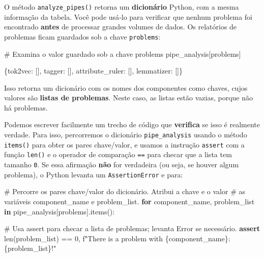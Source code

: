 \documentclass[
  brazilian,
  11pt,
]{article}
\newenvironment{Shaded}{\begin{snugshade}}{\end{snugshade}}
\newcommand{\BuiltInTok}[1]{\textcolor[rgb]{0.50,0.55,0.55}{#1}}
\newcommand{\CommentTok}[1]{\textcolor[rgb]{0.48,0.49,0.49}{#1}}
\newcommand{\ControlFlowTok}[1]{\textcolor[rgb]{0.99,0.74,0.29}{\textbf{#1}}}
\newcommand{\DecValTok}[1]{\textcolor[rgb]{0.96,0.45,0.00}{#1}}
\newcommand{\KeywordTok}[1]{\textcolor[rgb]{0.81,0.81,0.76}{\textbf{#1}}}
\newcommand{\NormalTok}[1]{\textcolor[rgb]{0.81,0.81,0.76}{#1}}
\newcommand{\OperatorTok}[1]{\textcolor[rgb]{0.81,0.81,0.76}{#1}}
\newcommand{\SpecialCharTok}[1]{\textcolor[rgb]{0.24,0.68,0.91}{#1}}
\newcommand{\SpecialStringTok}[1]{\textcolor[rgb]{0.85,0.27,0.33}{#1}}
\newcommand{\StringTok}[1]{\textcolor[rgb]{0.96,0.31,0.31}{#1}}
\let\oldtexttt\texttt
\renewcommand{\texttt}[1]{{\color{inlink}\oldtexttt{#1}}}
\begin{document}
O método \texttt{analyze\_pipes()} retorna um \textbf{dicionário}
Python, com a mesma informação da tabela. Você pode usá‑lo para
verificar que nenhum problema foi encontrado \textbf{antes} de processar
grandes volumes de dados. Os relatórios de problemas ficam guardados sob
a chave \texttt{problems}:

\begin{Shaded}
\begin{Highlighting}[]
\CommentTok{\# Examina o valor guardado sob a chave \textquotesingle{}problems\textquotesingle{}}
\NormalTok{pipe\_analysis[}\StringTok{\textquotesingle{}problems\textquotesingle{}}\NormalTok{]}
\end{Highlighting}
\end{Shaded}

\begin{Shaded}
\begin{Highlighting}[]
\NormalTok{\{\textquotesingle{}tok2vec\textquotesingle{}: [], \textquotesingle{}tagger\textquotesingle{}: [], \textquotesingle{}attribute\_ruler\textquotesingle{}: [], \textquotesingle{}lemmatizer\textquotesingle{}: []\}}
\end{Highlighting}
\end{Shaded}

Isso retorna um dicionário com os nomes dos componentes como chaves,
cujos valores são \textbf{listas de problemas}. Neste caso, as listas
estão vazias, porque não há problemas.

Podemos escrever facilmente um trecho de código que \textbf{verifica} se
isso é realmente verdade. Para isso, percorremos o dicionário
\texttt{pipe\_analysis} usando o método \texttt{items()} para obter os
pares chave/valor, e usamos a instrução \texttt{assert} com a função
\texttt{len()} e o operador de comparação \texttt{==} para checar que a
lista tem tamanho \texttt{0}. Se essa afirmação \textbf{não} for
verdadeira (ou seja, se houver algum problema), o Python levanta um
\texttt{AssertionError} e para:

\begin{Shaded}
\begin{Highlighting}[]
\CommentTok{\# Percorre os pares chave/valor do dicionário. Atribui a chave e o valor}
\CommentTok{\# as variáveis \textquotesingle{}component\_name\textquotesingle{} e \textquotesingle{}problem\_list\textquotesingle{}.}
\ControlFlowTok{for}\NormalTok{ component\_name, problem\_list }\KeywordTok{in}\NormalTok{ pipe\_analysis[}\StringTok{\textquotesingle{}problems\textquotesingle{}}\NormalTok{].items():}

    \CommentTok{\# Usa \textquotesingle{}assert\textquotesingle{} para checar a lista de problemas; levanta Error se necessário.}
    \ControlFlowTok{assert} \BuiltInTok{len}\NormalTok{(problem\_list) }\OperatorTok{==} \DecValTok{0}\NormalTok{, }\SpecialStringTok{f"There is a problem with }\SpecialCharTok{\{}\NormalTok{component\_name}\SpecialCharTok{\}}\SpecialStringTok{: }\SpecialCharTok{\{}\NormalTok{problem\_list}\SpecialCharTok{\}}\SpecialStringTok{!"}
\end{Highlighting}
\end{Shaded}
\end{document}
